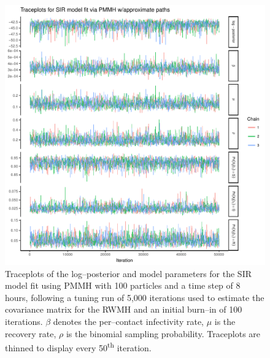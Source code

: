 \begin{figure}[htbp]
	\centering
	\includegraphics[width=0.9\linewidth]{figures/sir_pomp_approx_traceplots}
	\caption{Traceplots of the log--posterior and model parameters for the SIR model fit using PMMH with 100 particles and a time step of 8 hours, following a tuning run of 5,000 iterations used to estimate the covariance matrix for the RWMH and an initial burn--in of 100 iterations. $ \beta $ denotes the per--contact infectivity rate, $ \mu $ is the recovery rate, $ \rho $ is the binomial sampling probability. Traceplots are thinned to display every 50\textsuperscript{th} iteration.}
	\label{fig:sirpompapproxtraceplots}
\end{figure}

